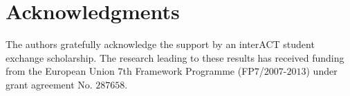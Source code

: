 \documentclass[a4paper]{article}
\begin{document}
\section{Acknowledgments}
\label{Acknowledgments}
The authors gratefully acknowledge the support by an \mbox{interACT} student exchange scholarship. The research leading to these results has received funding from the European Union $7$th Framework Programme (FP$7$/$2007$-$2013$) under grant agreement No. $287658$.




\end{document}
